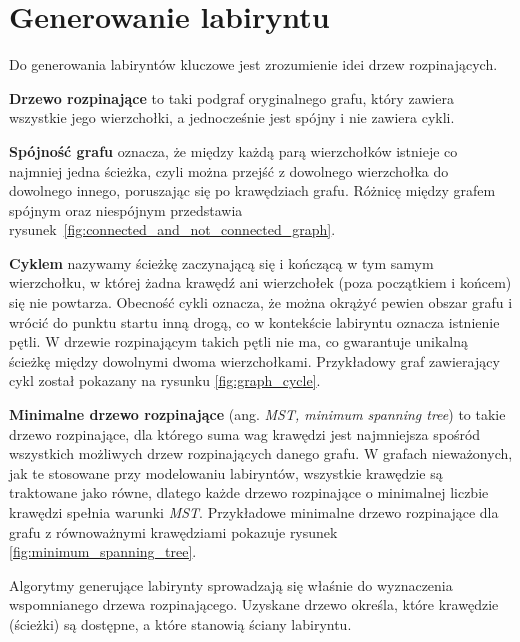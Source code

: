 \section{Generowanie labiryntu}

Do generowania labiryntów kluczowe jest zrozumienie idei drzew rozpinających.

\textbf{Drzewo rozpinające} \cite{cormen2009} to taki podgraf oryginalnego grafu, który zawiera wszystkie jego wierzchołki, a jednocześnie jest spójny i nie zawiera cykli. 

\textbf{Spójność grafu} \cite{balakrishnan2005} oznacza, że między każdą parą wierzchołków istnieje co najmniej jedna ścieżka, czyli można przejść z dowolnego wierzchołka do dowolnego innego, poruszając się po krawędziach grafu. Różnicę między grafem spójnym oraz niespójnym przedstawia rysunek~\ref{fig:connected_and_not_connected_graph}.



\textbf{Cyklem} \cite{balakrishnan2005} nazywamy ścieżkę zaczynającą się i kończącą w tym samym wierzchołku, w której żadna krawędź ani wierzchołek (poza początkiem i końcem) się nie powtarza. Obecność cykli oznacza, że można okrążyć pewien obszar grafu i wrócić do punktu startu inną drogą, co w kontekście labiryntu oznacza istnienie pętli. W drzewie rozpinającym takich pętli nie ma, co gwarantuje unikalną ścieżkę między dowolnymi dwoma wierzchołkami. Przykładowy graf zawierający cykl został pokazany na rysunku \ref{fig:graph_cycle}.



\textbf{Minimalne drzewo rozpinające} \cite{cormen2009} (ang. \textit{MST, minimum spanning tree}) to takie drzewo rozpinające, dla którego suma wag krawędzi jest najmniejsza spośród wszystkich możliwych drzew rozpinających danego grafu. W grafach nieważonych, jak te stosowane przy modelowaniu labiryntów, wszystkie krawędzie są traktowane jako równe, dlatego każde drzewo rozpinające o minimalnej liczbie krawędzi spełnia warunki \textit{MST}. Przykładowe minimalne drzewo rozpinające dla grafu z równoważnymi krawędziami pokazuje rysunek \ref{fig:minimum_spanning_tree}.



Algorytmy generujące labirynty sprowadzają się właśnie do wyznaczenia wspomnianego drzewa rozpinającego. 
Uzyskane drzewo określa, które krawędzie (ścieżki) są dostępne, a które stanowią ściany labiryntu.






